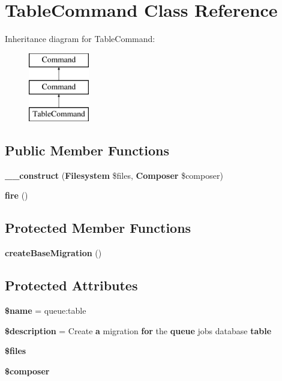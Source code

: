 \section{Table\+Command Class Reference}
\label{class_illuminate_1_1_queue_1_1_console_1_1_table_command}
Inheritance diagram for Table\+Command\+:\begin{figure}[H]
\begin{center}
\leavevmode
\includegraphics[height=3.000000cm]{class_illuminate_1_1_queue_1_1_console_1_1_table_command}
\end{center}
\end{figure}
\subsection*{Public Member Functions}
\begin{DoxyCompactItemize}
\item 
{\bf \+\_\+\+\_\+construct} ({\bf Filesystem} \$files, {\bf Composer} \$composer)
\item 
{\bf fire} ()
\end{DoxyCompactItemize}
\subsection*{Protected Member Functions}
\begin{DoxyCompactItemize}
\item 
{\bf create\+Base\+Migration} ()
\end{DoxyCompactItemize}
\subsection*{Protected Attributes}
\begin{DoxyCompactItemize}
\item 
{\bf \$name} = \textquotesingle{}queue\+:table\textquotesingle{}
\item 
{\bf \$description} = \textquotesingle{}Create {\bf a} migration {\bf for} the {\bf queue} jobs database {\bf table}\textquotesingle{}
\item 
{\bf \$files}
\item 
{\bf \$composer}
\end{DoxyCompactItemize}


